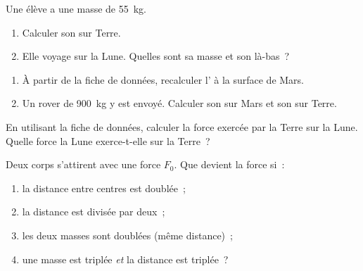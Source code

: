 \begin{exercise}[$\star$]\label{exo:g10:universal-gravitation:2}
Une élève a une masse de \qty{55}{kg}.
\begin{enumerate}
  \item Calculer son  sur Terre.
  \item Elle voyage sur la Lune. Quelles sont sa masse et son
         là-bas~?
\end{enumerate}
\end{exercise}

\begin{exercise}[$\star$]\label{exo:g10:universal-gravitation:3}
\begin{enumerate}
  \item À partir de la fiche de données, recalculer l' à la surface de Mars.
  \item Un rover de \qty{900}{kg} y est envoyé. Calculer son
         sur Mars et son  sur Terre.
\end{enumerate}
\end{exercise}

\begin{exercise}[$\star$]\label{exo:g10:universal-gravitation:4}
En utilisant la fiche de données, calculer la force exercée par la
Terre sur la Lune. Quelle force la Lune exerce-t-elle sur la Terre~?
\end{exercise}

\begin{exercise}[$\star$]\label{exo:g10:universal-gravitation:5}
Deux corps s'attirent avec une force $F_0$. Que devient la force si~:
\begin{enumerate}
  \item la distance entre centres est doublée~;
  \item la distance est divisée par deux~;
  \item les deux masses sont doublées (même distance)~;
  \item une masse est triplée \emph{et} la distance est triplée~?
\end{enumerate}
\end{exercise}

